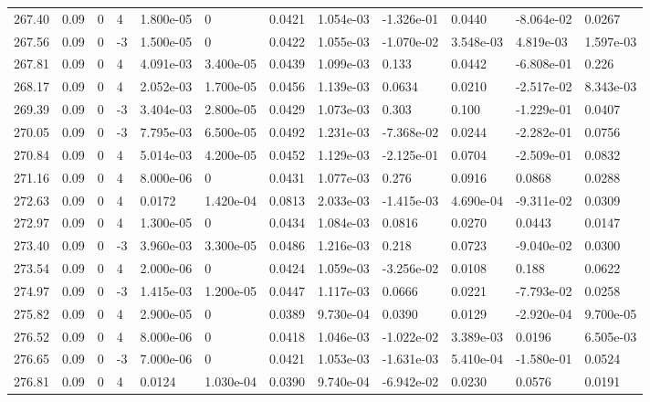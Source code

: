 \documentclass[preview]{standalone}
\begin{document}
{{{{{{{{{{{{{\begin{tabular}{L{1.2cm}C{1.2cm} C{0.3cm}C{0.5cm} C{1.4cm}C{1.4cm} C{1.4cm}C{1.4cm} C{1.6cm}C{1.6cm} C{1.6cm}C{1.6cm}}
  267.40  &  0.09  & 0     &  4 &  1.800e-05  & 0  &  0.0421&   1.054e-03& -1.326e-01 & 0.0440   &  -8.064e-02 & 0.0267  \\ 
  267.56  &  0.09  & 0     & -3 &  1.500e-05  & 0  &  0.0422&   1.055e-03& -1.070e-02 & 3.548e-03   &  4.819e-03 & 1.597e-03  \\ 
  267.81  &  0.09  & 0     &  4 &  4.091e-03  & 3.400e-05  &  0.0439&   1.099e-03& 0.133 & 0.0442   &  -6.808e-01 & 0.226  \\ 
  268.17  &  0.09  & 0     &  4 &  2.052e-03  & 1.700e-05  &  0.0456&   1.139e-03& 0.0634 & 0.0210   &  -2.517e-02 & 8.343e-03  \\ 
  269.39  &  0.09  & 0     & -3 &  3.404e-03  & 2.800e-05  &  0.0429&   1.073e-03& 0.303 & 0.100   &  -1.229e-01 & 0.0407  \\ 
  270.05  &  0.09  & 0     & -3 &  7.795e-03  & 6.500e-05  &  0.0492&   1.231e-03& -7.368e-02 & 0.0244   &  -2.282e-01 & 0.0756  \\ 
  270.84  &  0.09  & 0     &  4 &  5.014e-03  & 4.200e-05  &  0.0452&   1.129e-03& -2.125e-01 & 0.0704   &  -2.509e-01 & 0.0832  \\ 
  271.16  &  0.09  & 0     &  4 &  8.000e-06  & 0  &  0.0431&   1.077e-03& 0.276 & 0.0916   &  0.0868 & 0.0288  \\ 
  272.63  &  0.09  & 0     &  4 &  0.0172  & 1.420e-04  &  0.0813&   2.033e-03& -1.415e-03 & 4.690e-04   &  -9.311e-02 & 0.0309  \\ 
  272.97  &  0.09  & 0     &  4 &  1.300e-05  & 0  &  0.0434&   1.084e-03& 0.0816 & 0.0270   &  0.0443 & 0.0147  \\ 
  273.40  &  0.09  & 0     & -3 &  3.960e-03  & 3.300e-05  &  0.0486&   1.216e-03& 0.218 & 0.0723   &  -9.040e-02 & 0.0300  \\ 
  273.54  &  0.09  & 0     &  4 &  2.000e-06  & 0  &  0.0424&   1.059e-03& -3.256e-02 & 0.0108   &  0.188 & 0.0622  \\ 
  274.97  &  0.09  & 0     & -3 &  1.415e-03  & 1.200e-05  &  0.0447&   1.117e-03& 0.0666 & 0.0221   &  -7.793e-02 & 0.0258  \\ 
  275.82  &  0.09  & 0     &  4 &  2.900e-05  & 0  &  0.0389&   9.730e-04& 0.0390 & 0.0129   &  -2.920e-04 & 9.700e-05  \\ 
  276.52  &  0.09  & 0     &  4 &  8.000e-06  & 0  &  0.0418&   1.046e-03& -1.022e-02 & 3.389e-03   &  0.0196 & 6.505e-03  \\ 
  276.65  &  0.09  & 0     & -3 &  7.000e-06  & 0  &  0.0421&   1.053e-03& -1.631e-03 & 5.410e-04   &  -1.580e-01 & 0.0524  \\ 
  276.81  &  0.09  & 0     &  4 &  0.0124  & 1.030e-04  &  0.0390&   9.740e-04& -6.942e-02 & 0.0230   &  0.0576 & 0.0191  \\ 
\hline 
\end{tabular} 

}}}}}}}}}}}}}
\end{document}
